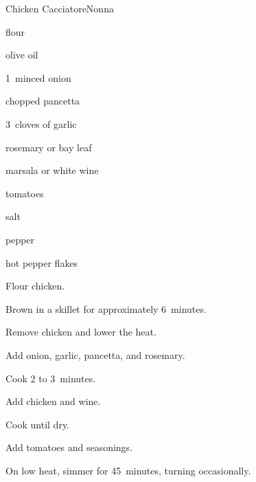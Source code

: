 \begin{recipe}{Chicken Cacciatore}{Nonna}{}

\begin{ingredients}
\item flour
\item \C{\quarter} olive oil
\item 1~minced onion
\item {} chopped pancetta
\item 3~cloves of garlic
\item {} rosemary or bay leaf
\item {} marsala or white wine
\item {} tomatoes
\item salt
\item pepper
\item hot pepper flakes
\end{ingredients}

\begin{directions}
\item Flour chicken.
\item Brown in a skillet for approximately 6~minutes.
\item Remove chicken and lower the heat.
\item Add onion, garlic, pancetta, and rosemary.
\item Cook 2 to 3~minutes.
\item Add chicken and wine.
\item Cook until dry.
\item Add tomatoes and seasonings.
\item On low heat, simmer for 45~minutes, turning occasionally.
\end{directions}

\end{recipe}
